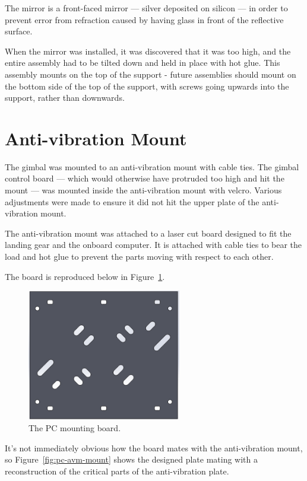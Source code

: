 \documentclass[12pt,oneside,a4paper]{book}
\begin{document}
The mirror is a front-faced mirror --- silver deposited on silicon ---
in order to prevent error from refraction caused by having glass in
front of the reflective surface.

When the mirror was installed, it was discovered that it was too high,
and the entire assembly had to be tilted down and held in place with
hot glue. This assembly mounts on the top of the support - future
assemblies should mount on the bottom side of the top of the support,
with screws going upwards into the support, rather than downwards.

\newpage
\section{Anti-vibration Mount}
\label{sec:attach-hexac-land}

The gimbal was mounted to an anti-vibration mount with cable
ties. The gimbal control board --- which would otherwise have
protruded too high and hit the mount --- was mounted inside the
anti-vibration mount with velcro. Various adjustments were made to
ensure it did not hit the upper plate of the anti-vibration mount.

The anti-vibration mount was attached to a laser cut board designed to
fit the landing gear and the onboard computer. It is attached with
cable ties to bear the load and hot glue to prevent the parts moving
with respect to each other.

The board is reproduced below in Figure~\ref{fig:pc-mount}.

\begin{figure}[h]
  \centering
    \includegraphics[width=0.6\textwidth]{figs/pc-mount}
  \caption{The PC mounting board.}
  \label{fig:pc-mount}
\end{figure}

It's not immediately obvious how the board mates with the
anti-vibration mount, so Figure~\ref{fig:pc-avm-mount} shows the
designed plate mating with a reconstruction of the critical parts of
the anti-vibration plate.
\end{document}
